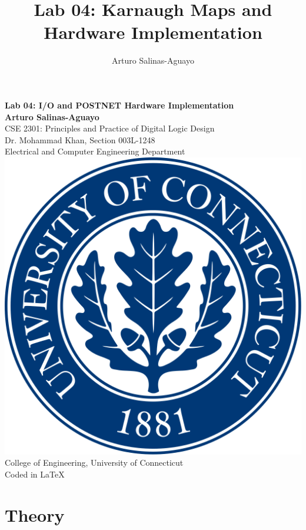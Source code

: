 \documentclass[12pt]{article}
\author{Arturo Salinas-Aguayo}
\title{Lab 04: Karnaugh Maps and Hardware Implementation}
\begin{document}
\newcommand{\closure}[2][3]{%
	{}\mkern#1mu\overline{\mkern-#1mu#2}}
\newcommand\ncoverline[1]{\mkern1mu\overline{\mkern-1mu#1\mkern-1mu}\mkern1mu}
\begin{titlepage}
	\centering
	\vspace*{3cm}
	\huge\textbf{Lab 04: I/O and POSTNET Hardware Implementation}\\
	\vspace{5cm}
	\Large\textbf{Arturo Salinas-Aguayo}\\
	\normalsize
	CSE 2301: Principles and Practice of Digital Logic Design\\
	Dr. Mohammad Khan, Section 003L-1248\\
	Electrical and Computer Engineering Department
	\vfill
	\includegraphics[scale=0.1]{uconnlogo}\\
	College of Engineering, University of Connecticut\\
	\scriptsize{Coded in \LaTeX}
	\vspace*{1cm}
\end{titlepage}
\section*{Theory}
\end{document}

